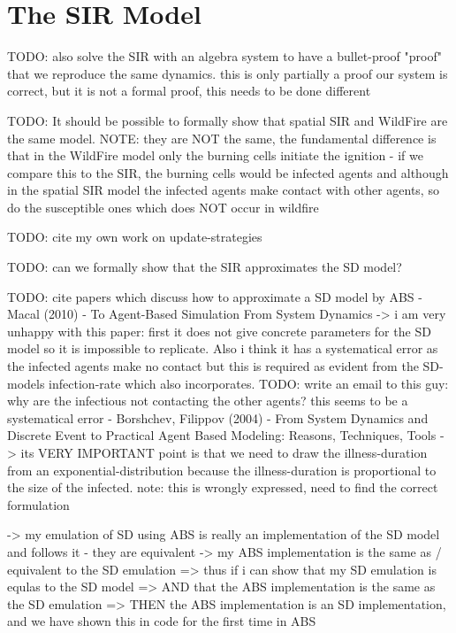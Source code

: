 \section{The SIR Model}




TODO: also solve the SIR with an algebra system to have a bullet-proof "proof" that we reproduce the same dynamics. this is only partially a proof our system is correct, but it is not a formal proof, this needs to be done different

TODO: It should be possible to formally show that spatial SIR and WildFire are the same model. NOTE: they are NOT the same, the fundamental difference is that in the WildFire model only the burning cells initiate the ignition - if we compare this to the SIR, the burning cells would be infected agents and although in the spatial SIR model the infected agents make contact with other agents, so do the susceptible ones which does NOT occur in wildfire

TODO: cite my own work on update-strategies

TODO: can we formally show that the SIR approximates the SD model?

TODO: cite papers which discuss how to approximate a SD model by ABS
- Macal (2010) - To Agent-Based Simulation From System Dynamics 
	-> i am very unhappy with this paper: first it does not give concrete parameters for the SD model so it is impossible to replicate. Also i think it has a systematical error as the infected agents make no contact but this is required as evident from the SD-models infection-rate which also incorporates. TODO: write an email to this guy: why are the infectious not contacting the other agents? this seems to be a systematical error
- Borshchev, Filippov (2004) - From System Dynamics and Discrete Event to Practical Agent Based Modeling: Reasons, Techniques, Tools
	-> its VERY IMPORTANT point is that we need to draw the illness-duration from an exponential-distribution because the illness-duration is proportional to the size of the infected. note: this is wrongly expressed, need to find the correct formulation

		-> my emulation of SD using ABS is really an implementation of the SD model and follows it - they are equivalent
		-> my ABS implementation is the same as / equivalent to the SD emulation
			=> thus if i can show that my SD emulation is equlas to the SD model
			=> AND that the ABS implementation is the same as the SD emulation
			=> THEN the ABS implementation is an SD implementation, and we have shown this in code for the first time in ABS
			
